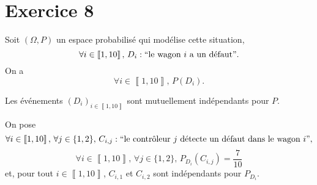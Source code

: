 \part{Exercice 8}

Soit $(\Omega, P)$ un espace probabilisé qui modélise cette situation, \[
	\forall i \in \left\llbracket 1,10 \right\rrbracket,\,D_i:``\text{le wagon } i \text{ a un défaut}"
.\]
On a \[
	\forall i \in \left\llbracket 1,10 \right\rrbracket,\,P(D_i)
.\] 

Les événements $(D_i)_{i\in\left\llbracket 1,10 \right\rrbracket}$ sont mutuellement indépendants pour $P$.

On pose \[
	\forall i \in \left\llbracket 1,10 \right\rrbracket,\,\forall j \in \{1,2\},\,C_{i,j}: ``\text{le contrôleur } j \text{ détecte un défaut dans le wagon } i",
\] \[
	\forall i \in \left\llbracket 1,10 \right\rrbracket,\,\forall j \in \{1,2\},\,P_{D_i}(C_{i,j}) = \frac{7}{10}
\] et, pour tout $i \in \left\llbracket 1,10 \right\rrbracket$, $C_{i,1}$ et $C_{i,2}$ sont indépendants pour $P_{D_i}$.

